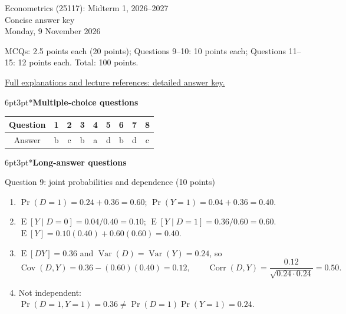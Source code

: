 \documentclass[a4paper,11pt,twoside]{article}
\makeatletter
\newcommand{\E}{\operatorname{E}}
\newcommand{\Var}{\operatorname{Var}}
\newcommand{\Cov}{\operatorname{Cov}}
\newcommand{\Corr}{\operatorname{Corr}}
\newcommand{\heading}[1]{\par\medskip\noindent #1\par\nobreak\smallskip}
\renewcommand{\section}{\@startsection{section}{1}{\z@}%
  {6pt}{3pt}{\normalfont\fontsize{12}{14}\selectfont}}
\makeatother
\begin{document}
\begin{center}
{\fontsize{12}{14}\selectfont Econometrics (25117): Midterm 1, 2026--2027}\\
Concise answer key\\
\normalsize Monday, 9 November 2026
\end{center}

MCQs: 2.5 points each (20 points); Questions 9--10: 10 points each;
Questions 11--15: 12 points each. Total: 100 points.

\href{Midterm1_2026_2027_solutions.pdf}{Full explanations and lecture references: detailed answer key.}

\section*{\textbf{Multiple-choice questions}}
\begin{center}
\begin{tabular}{c|cccccccc}
Question & 1 & 2 & 3 & 4 & 5 & 6 & 7 & 8 \\ \hline
Answer & b & c & b & a & d & b & d & c
\end{tabular}
\end{center}

\section*{\textbf{Long-answer questions}}
\heading{Question 9: joint probabilities and dependence (10 points)}
\begin{enumerate}[label=(\alph*),leftmargin=*,itemsep=2pt,topsep=2pt]
\item $\Pr(D=1)=0.24+0.36=0.60$; $\Pr(Y=1)=0.04+0.36=0.40$.
\item $\E[Y\mid D=0]=0.04/0.40=0.10$;
$\E[Y\mid D=1]=0.36/0.60=0.60$.
$\E[Y]=0.10(0.40)+0.60(0.60)=0.40$.
\item $\E[DY]=0.36$ and $\Var(D)=\Var(Y)=0.24$, so
\[
\Cov(D,Y)=0.36-(0.60)(0.40)=0.12,\qquad
\Corr(D,Y)=\frac{0.12}{\sqrt{0.24\cdot0.24}}=0.50.
\]
\item Not independent: $\Pr(D=1,Y=1)=0.36\ne
\Pr(D=1)\Pr(Y=1)=0.24$.
\end{enumerate}
\end{document}
